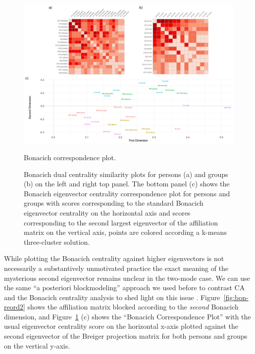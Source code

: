 \documentclass[a4paper,fleqn]{cas-sc}
\begin{document}
\begin{figure}[ht!]
    \captionsetup[subfigure]{font=footnotesize,labelfont=footnotesize}
    \centering
        \includegraphics[width=1.0\textwidth]{Plots/bon-corr-plot.png}
            \caption{Bonacich correspondence plot.}
            \label{fig:bon-corr}
    \caption{Bonacich dual centrality similarity plots for persons (a) and groups (b) on the left and right top panel. The bottom panel (c) shows the Bonacich eigenvector centrality correspondence plot for persons and groups with scores corresponding to the standard Bonacich eigenvector centrality on the horizontal axis and scores corresponding to the second largest eigenvector of the affiliation matrix on the vertical axis, points are colored according a k-means three-cluster solution.}
    \label{fig:bon-sim}
\end{figure}

While plotting the Bonacich centrality against higher eigenvectors is not necessarily a substantively unmotivated practice \citep[see][for discussion in the one-mode network case]{iacobucci2017eigenvector} the exact meaning of the mysterious second eigenvector remains unclear in the two-mode case. We can use the same ``a posteriori blockmodeling'' approach we used before to contrast CA and the Bonacich centrality analysis to shed light on this issue \citep{wasserman1987stochastic}. Figure~\ref{fig:bon-reord2} shows the affiliation matrix blocked according to the \textit{second} Bonacich dimension, and Figure~\ref{fig:bon-sim} (c) shows the ``Bonacich Correspondence Plot'' with the usual eigenvector centrality score on the horizontal x-axis plotted against the second eigenvector of the Breiger projection matrix for both persons and groups on the vertical y-axis. 
\end{document}
